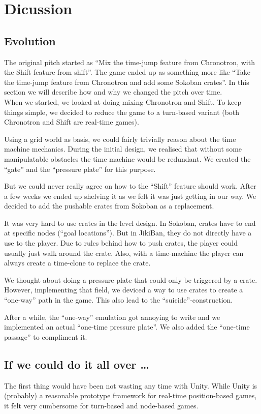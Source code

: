 \section{Dicussion}

\subsection{Evolution}
The original pitch started as ``Mix the time-jump feature from
Chronotron, with the Shift feature from shift''.  The game ended up as
something more like ``Take the time-jump feature from Chronotron and
add some Sokoban crates''.  In this section we will describe how and why
we changed the pitch over time.\\


When we started, we looked at doing mixing Chronotron and Shift.  To
keep things simple, we decided to reduce the game to a turn-based
variant (both Chronotron and Shift are real-time games).

Using a grid world as basis, we could fairly trivially reason about
the time machine mechanics.  During the initial design, we realised
that without some manipulatable obstacles the time machine would be
redundant.  We created the ``gate'' and the ``pressure plate'' for
this purpose.

But we could never really agree on how to the ``Shift'' feature should
work.  After a few weeks we ended up shelving it as we felt it was
just getting in our way.  We decided to add the pushable crates from
Sokoban as a replacement.

It was very hard to use crates in the level design.  In Sokoban,
crates have to end at specific nodes (``goal locations'').  But in
JikiBan, they do not directly have a use to the player.  Due to rules
behind how to push crates, the player could usually just walk around
the crate.  Also, with a time-machine the player can always create a
time-clone to replace the crate.

We thought about doing a pressure plate that could only be triggered
by a crate.  However, implementing that field, we deviced a way to use
crates to create a ``one-way'' path in the game.  This also lead to
the ``suicide''-construction.

After a while, the ``one-way'' emulation got annoying to write and we
implemented an actual ``one-time pressure plate''.  We also added the
``one-time passage'' to compliment it.


\subsection{If we could do it all over \ldots}
The first thing would have been not wasting any time with Unity.
While Unity is (probably) a reasonable prototype framework for
real-time position-based games, it felt very cumbersome for turn-based
and node-based games.


